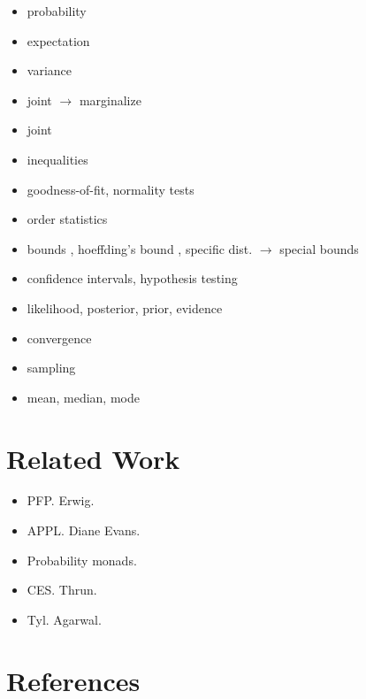\documentclass{article}
\begin{document}
\begin{itemize}
\item probability
\item expectation
\item variance 
\item joint $\rightarrow$ marginalize
\item joint 
\item inequalities
\item goodness-of-fit, normality tests
\item order statistics
\item bounds , hoeffding's bound , specific dist. $\rightarrow$ special bounds
\item confidence intervals, hypothesis testing
\item likelihood, posterior, prior, evidence
\item convergence
\item sampling
\item mean, median, mode
\end{itemize}

\section{Related Work}

\begin{itemize}
\item PFP. Erwig.
\item APPL. Diane Evans.
\item Probability monads.
\item CES. Thrun.
\item Tyl. Agarwal.
\end{itemize}


\section{References}
\end{document}
